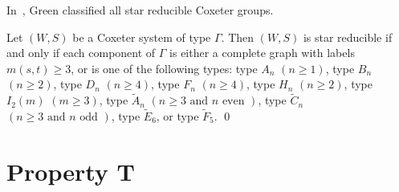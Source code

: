 In~\cite{Green2006a}, Green classified all star reducible Coxeter groups.

\begin{proposition}
	Let $(W,S)$ be a Coxeter system of type $\Gamma$. Then $(W,S)$ is star reducible if and only if each component of $\Gamma$ is either a complete graph with labels $m(s,t)\geq 3$, or is one of the following types: type $A_n$ $(n \geq 1)$, type $B_n$ $(n \geq 2)$, type $D_n$ $(n \geq 4)$, type $F_n$ $(n \geq 4)$, type $H_n$ $(n \geq 2)$, type $I_2(m)$ $(m \geq 3)$, type $\widetilde{A}_{n}$ $(n \geq 3 \textrm{ and } n \textrm{ even })$, type $\widetilde{C}_{n}$ $(n\geq 3 \textrm{ and } n \textrm{ odd })$, type $\widetilde{E}_6$, or type $\widetilde{F}_5$. \qed
\end{proposition}    


\section{Property T}\label{Tavoid}

